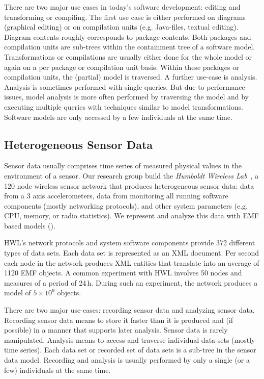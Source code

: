 There are two major use cases in today's software development: editing and transforming or compiling. The first use case is either performed on diagrams (graphical editing) or on compilation units (e.g. Java-files, textual editing). Diagram contents roughly corresponds to package contents. Both packages and compilation units are sub-trees within the containment tree of a software model.  Transformations or compilations are usually either done for the whole model or again on a per package or compilation unit basis. Within these packages or compilation units, the (partial) model is traversed. A further use-case is analysis. Analysis is sometimes performed with single queries. But due to performance issues, model analysis is more often performed by traversing the model and by executing multiple queries with techniques similar to model transformations. Software models are only accessed by a few individuals at the same time.

\subsection{Heterogeneous Sensor Data}

Sensor data usually comprises time series of measured physical values in the environment of a sensor. Our research group build the \emph{Humboldt Wireless Lab}~\cite{hwl}, a 120 node wireless sensor network that produces heterogeneous sensor data: data from a 3 axis accelerometers, data from monitoring all running software components (mostly networking protocols), and other system parameters (e.g. CPU, memory, or radio statistics). We represent and analyze this data with EMF based models (\cite{clickwatch}).


HWL's network protocols and system software components provide 372 different types of data sets. Each data set is represented as an XML document. Per second each node in the network produces XML entities that translate into an average of 1120 EMF objects. A common experiment with HWL involves 50 nodes and measures of a period of 24\,h. During such an experiment, the network produces a model of $5\times 10^9$ objects. 

There are two major use-cases: recording sensor data and analyzing sensor data. Recording sensor data means to store it faster than it is produced and (if possible) in a manner that supports later analysis. Sensor data is rarely manipulated. Analysis means to access and traverse individual data sets (mostly time series). Each data set or recorded set of data sets is a sub-tree in the sensor data model. Recording and analysis is usually performed by only a single (or a few) individuals at the same time. 

